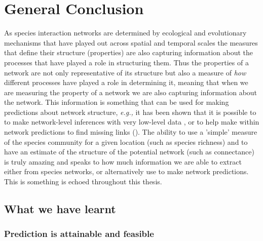 \anglais
\doublespacing
\chapter{General Conclusion}\label{Conclusion}
\begin{refsection}

As species interaction networks are determined by ecological and evolutionary mechanisms that have played out across spatial and temporal scales the measures that define their structure (properties) are also capturing information about the processes that have played a role in structuring them. Thus the properties of a network are not only representative of its structure but also a measure of \emph{how} different processes have played a role in determining it, meaning that when we are measuring the property of a network we are also capturing information about the network. This information is something that can be used for making predictions about network structure, \emph{e.g.,} it has been shown that it is possible to to make network-level inferences with very low-level data \cite{MacDonald2020Revisiting, Banville2023What}, or to help make within network predictions to find missing links (\cite{Poisot2023Network, Stock2021Pairwise}). The ability to use a 'simple' measure of the species community for a given location (such as species richness) and to have an estimate of the structure of the potential network (such as connectance) is truly amazing and speaks to how much information we are able to extract either from species networks, or alternatively use to make network predictions. This is something is echoed throughout this thesis.

\section{What we have learnt}

\subsection{Prediction is attainable and feasible}


\end{refsection}
